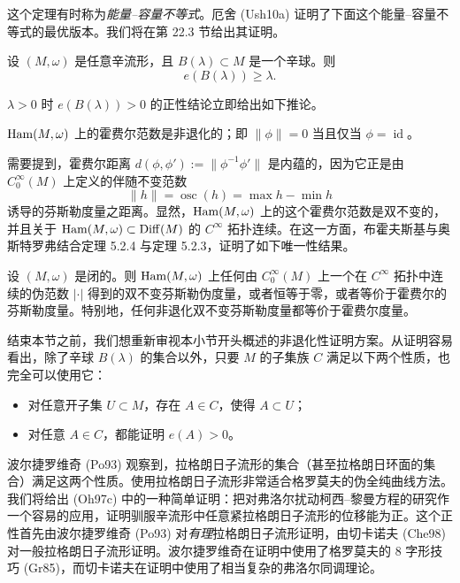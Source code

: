 这个定理有时称为\emph{能量--容量不等式}。厄舍 (Ush10a) 证明了下面这个能量--容量不等式的最优版本。我们将在第 22.3 节给出其证明。

\begin{theorem}
\label{thm:optimal-energy-capacity}
设 $(M,\omega)$ 是任意辛流形，且 $B(\lambda)\subset M$ 是一个辛球。则
\[
 e(B(\lambda))\geq\lambda.
\]
\end{theorem}

$\lambda>0$ 时 $e(B(\lambda))>0$ 的正性结论立即给出如下推论。

\begin{corollary}\label{cor:hofer-norm-nondegenerate}
$\operatorname{Ham}(M,\omega)$ 上的霍费尔范数是非退化的；即
$\|\phi\|=0$ 当且仅当 $\phi=\operatorname{id}$。
\end{corollary}

需要提到，霍费尔距离
$d(\phi,\phi'):=\|\phi^{-1}\phi'\|$ 是内蕴的，因为它正是由
$C_0^\infty(M)$ 上定义的伴随不变范数
\[
 \|h\|=\operatorname{osc}(h)=\max h-\min h
\]
诱导的芬斯勒度量之距离。显然，$\operatorname{Ham}(M,\omega)$ 上的这个霍费尔范数是双不变的，并且关于
$\operatorname{Ham}(M,\omega)\subset\operatorname{Diff}(M)$ 的 $C^\infty$ 拓扑连续。在这一方面，布霍夫斯基与奥斯特罗弗结合定理 5.2.4 与定理 5.2.3，证明了如下唯一性结果。

\begin{theorem}\label{thm:hofer-finsler-uniqueness}
设 $(M,\omega)$ 是闭的。则 $\operatorname{Ham}(M,\omega)$ 上任何由
$C_0^\infty(M)$ 上一个在 $C^\infty$ 拓扑中连续的伪范数
$|\mathord\cdot|$ 得到的双不变芬斯勒伪度量，或者恒等于零，或者等价于霍费尔的芬斯勒度量。特别地，任何非退化双不变芬斯勒度量都等价于霍费尔度量。
\end{theorem}

结束本节之前，我们想重新审视本小节开头概述的非退化性证明方案。从证明容易看出，除了辛球 $B(\lambda)$ 的集合以外，只要 $M$ 的子集族
$C$ 满足以下两个性质，也完全可以使用它：
\begin{itemize}
 \item 对任意开子集 $U\subset M$，存在 $A\in C$，使得
 $A\subset U$；
 \item 对任意 $A\in C$，都能证明 $e(A)>0$。
\end{itemize}
波尔捷罗维奇 (Po93) 观察到，拉格朗日子流形的集合（甚至拉格朗日环面的集合）满足这两个性质。使用拉格朗日子流形非常适合格罗莫夫的伪全纯曲线方法。我们将给出 (Oh97c) 中的一种简单证明：把对弗洛尔扰动柯西--黎曼方程的研究作一个容易的应用，证明驯服辛流形中任意紧拉格朗日子流形的位移能为正。这个正性首先由波尔捷罗维奇 (Po93) 对\emph{有理}拉格朗日子流形证明，由切卡诺夫 (Che98) 对一般拉格朗日子流形证明。波尔捷罗维奇在证明中使用了格罗莫夫的 8 字形技巧 (Gr85)，而切卡诺夫在证明中使用了相当复杂的弗洛尔同调理论。
